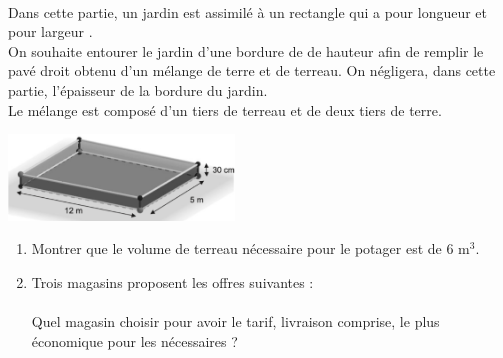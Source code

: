 \pagebreak


\begin{activite}
   \ \\ [-16mm]
   \begin{QCM}
      Dans cette partie, un jardin est assimilé à un rectangle qui a pour longueur  et pour largeur . \\
      On souhaite entourer le jardin d’une bordure de  de hauteur afin de remplir le pavé droit obtenu d’un mélange de terre et de terreau. On négligera, dans cette partie, l’épaisseur de la bordure du jardin. \\
Le mélange est composé d’un tiers de terreau et de deux tiers de terre.
\begin{center}
   \includegraphics[width=6cm]{Grandeurs_mesures/Images/M14_ex_jardin}
\end{center}
\begin{enumerate}
   \item Montrer que le volume de terreau nécessaire pour le potager est de 6 m$^3$.
   \item Trois magasins proposent les offres suivantes : \\ [2mm]
      \quad
      \quad
       \\ [2mm]
      Quel magasin choisir pour avoir le tarif, livraison comprise, le plus économique pour les  nécessaires ? \\ [-8mm]
\end{enumerate}


\end{QCM}
\end{activite}
